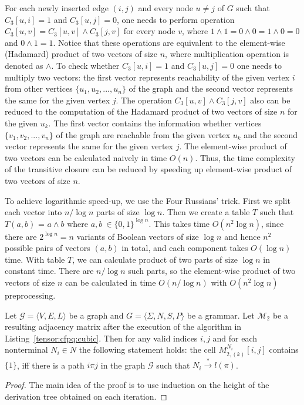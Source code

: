 For each newly inserted edge $(i, j)$ and every node $u \neq j$ of $G$ such that $C_3[u, i] = 1$ and $C_3[u, j]=0$, one needs to perform operation $C_3[u,v] = C_3[u, v] \wedge C_3[j, v]$ for every node $v$, where $1 \wedge 1 = 0 \wedge 0 = 1 \wedge 0 = 0$ and $0 \wedge 1 = 1$.
Notice that these operations are equivalent to the element-wise (Hadamard) product of two vectors of size $n$, where multiplication operation is denoted as $\wedge$. To check whether $C_3[u, i] = 1$ and $C_3[u, j]=0$ one needs to multiply two vectors: the first vector represents reachability of the given vertex $i$ from other vertices $\{u_1, u_2, ..., u_n\}$ of the graph and the second vector represents the same for the given vertex $j$. The operation $C_3[u, v] \wedge C_3[j, v]$ also can be reduced to the computation of the Hadamard product of two vectors of size $n$ for the given $u_k$. The first vector contains the information whether vertices  $\{v_1, v_2, ..., v_n\}$ of the graph are reachable from the given vertex $u_k$ and the second vector represents the same for the given vertex $j$. The element-wise product of two vectors can be calculated naively in time $O(n)$. Thus, the time complexity of the transitive closure can be reduced by speeding up element-wise product of two vectors of size $n$.


To achieve logarithmic speed-up, we use the Four Russians' trick.
First we split each vector into $n/\log n$ parts of size $\log n$.
Then we create a table $T$ such that $T(a, b)$ = $a \wedge b$ where $a, b \ \in {\{0,1\}}^{\log n}$.
This takes time $O(n^2 \log n)$, since there are $2^{\log n} = n$ variants of Boolean vectors of size $\log n$ and hence $n^2$ possible pairs of vectors $(a, b)$ in total, and each component takes $O(\log n)$ time.
With table $T$, we can calculate product of two parts of size $\log n$ in constant time.
There are $n/\log n$ such parts, so the element-wise product of two vectors of size $n$ can be calculated in time $O(n/\log n)$ with $O(n^2 \log n)$ preprocessing.

\begin{theorem}
    Let $\mathcal{G} =  \langle V,E,L\rangle$ be a graph and $G = \langle\Sigma, N, S, P\rangle$ be a grammar.
    Let $\mathcal{M}_{2}$ be a resulting adjacency matrix after the execution of the algorithm in Listing~\ref{tensor:cfpq:cubic}. Then for any valid indices $i, j$ and for each nonterminal $N_i \in N$ the following statement holds: the cell $M_{2,(k)}^{N_i}[i,j]$ contains $\{1\}$, iff there is a path $i\pi j$ in the graph $\mathcal{G}$ such that $ N_i \xrightarrow{*} l(\pi)$.
\end{theorem}{}
\begin{proof}
    The main idea of the proof is to use induction on the height of the derivation tree obtained on each iteration.
\end{proof}{}

